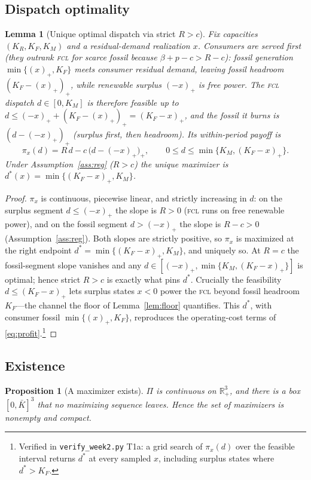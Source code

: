 \documentclass[11pt,reqno]{amsart}
\theoremstyle{plain}
\newtheorem{proposition}{Proposition}
\newtheorem{lemma}{Lemma}
\theoremstyle{definition}
\theoremstyle{remark}
\newcommand{\KR}{K_R}
\newcommand{\KF}{K_F}
\newcommand{\KM}{K_M}
\newcommand{\bp}{\beta+p}
\begin{document}
\subsection{Dispatch optimality}

\begin{lemma}[Unique optimal dispatch via strict $R>c$]\label{lem:dispatch}
Fix capacities $(\KR,\KF,\KM)$ and a residual-demand realization $x$. Consumers are
served first (they outrank \textsc{fcl} for scarce fossil because $\bp-c>R-c$):
fossil generation $\min\{(x)_+,\KF\}$ meets consumer residual demand, leaving fossil
headroom $(\KF-(x)_+)_+$, while renewable surplus $(-x)_+$ is free power. The
\textsc{fcl} dispatch $d\in[0,\KM]$ is therefore feasible up to
$d\le(-x)_+ + (\KF-(x)_+)_+=(\KF-x)_+$, and the fossil it burns is $(d-(-x)_+)_+$
(surplus first, then headroom). Its within-period payoff is
\[
  \pi_x(d)=R\,d-c\,\big(d-(-x)_+\big)_+,\qquad 0\le d\le\min\{\KM,(\KF-x)_+\}.
\]
Under Assumption~\ref{ass:reg} ($R>c$) the unique maximizer is
$d^{*}(x)=\min\{(\KF-x)_+,\KM\}$.
\end{lemma}

\begin{proof}
$\pi_x$ is continuous, piecewise linear, and strictly increasing in $d$: on the
surplus segment $d\le(-x)_+$ the slope is $R>0$ (\textsc{fcl} runs on free
renewable power), and on the fossil segment $d>(-x)_+$ the slope is $R-c>0$
(Assumption~\ref{ass:reg}). Both slopes are strictly positive, so $\pi_x$ is
maximized at the right endpoint $d^{*}=\min\{(\KF-x)_+,\KM\}$, and uniquely so.
At $R=c$ the fossil-segment slope vanishes and any
$d\in[(-x)_+,\min\{\KM,(\KF-x)_+\}]$ is optimal; hence strict $R>c$ is exactly
what pins $d^{*}$. Crucially the feasibility $d\le(\KF-x)_+$ lets surplus states
$x<0$ power the \textsc{fcl} beyond fossil headroom $\KF$---the channel the floor
of Lemma~\ref{lem:floor} quantifies. This $d^{*}$, with consumer fossil
$\min\{(x)_+,\KF\}$, reproduces the operating-cost terms of
\eqref{eq:profit}.\footnote{Verified in \texttt{verify\_week2.py} T1a: a grid
search of $\pi_x(d)$ over the feasible interval returns $d^{*}$ at every sampled
$x$, including surplus states where $d^{*}>\KF$.}
\end{proof}

\subsection{Existence}

\begin{proposition}[A maximizer exists]\label{prop:exist}
$\Pi$ is continuous on $\mathbb R_{+}^{3}$, and there is a box $[0,\bar K]^{3}$
that no maximizing sequence leaves. Hence the set of maximizers is nonempty and
compact.
\end{proposition}
\end{document}

